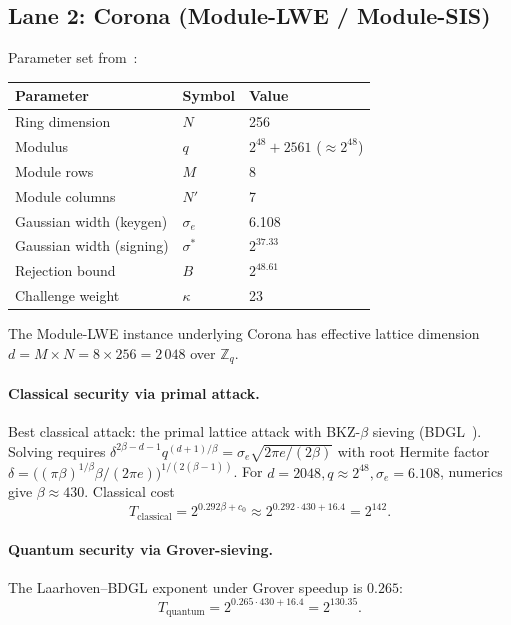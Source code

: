 \documentclass[11pt]{article}
\begin{document}
\subsection{Lane 2: Corona (Module-LWE / Module-SIS)}

Parameter set from~\cite{corona}:

\begin{center}
\begin{tabular}{lll}
\toprule
\textbf{Parameter} & \textbf{Symbol} & \textbf{Value} \\
\midrule
Ring dimension   & $N$         & 256 \\
Modulus          & $q$         & $2^{48} + 2561$ ($\approx 2^{48}$) \\
Module rows      & $M$         & 8 \\
Module columns   & $N'$        & 7 \\
Gaussian width (keygen) & $\sigma_e$ & 6.108 \\
Gaussian width (signing)& $\sigma^*$ & $2^{37.33}$ \\
Rejection bound  & $B$         & $2^{48.61}$ \\
Challenge weight & $\kappa$    & 23 \\
\bottomrule
\end{tabular}
\end{center}

The Module-LWE instance underlying Corona has effective lattice
dimension $d = M \times N = 8 \times 256 = 2\,048$ over
$\mathbb{Z}_q$.

\paragraph{Classical security via primal attack.}
Best classical attack: the primal lattice attack with BKZ-$\beta$
sieving (BDGL~\cite{bdgl2016}).  Solving requires
$\delta^{2\beta - d - 1} q^{(d+1)/\beta} = \sigma_e \sqrt{2\pi e /
(2\beta)}$ with root Hermite factor
$\delta = \bigl((\pi\beta)^{1/\beta} \beta / (2\pi e)\bigr)^{1/(2(\beta
-1))}$.  For $d = 2048, q \approx 2^{48}, \sigma_e = 6.108$, numerics
give $\beta \approx 430$.  Classical cost
\[
  T_{\mathrm{classical}} = 2^{0.292\beta + c_0}
  \approx 2^{0.292 \cdot 430 + 16.4}
  = 2^{142}.
\]

\paragraph{Quantum security via Grover-sieving.}
The Laarhoven--BDGL exponent under Grover speedup is $0.265$:
\[
  T_{\mathrm{quantum}} = 2^{0.265 \cdot 430 + 16.4} = 2^{130.35}.
\]
\end{document}
